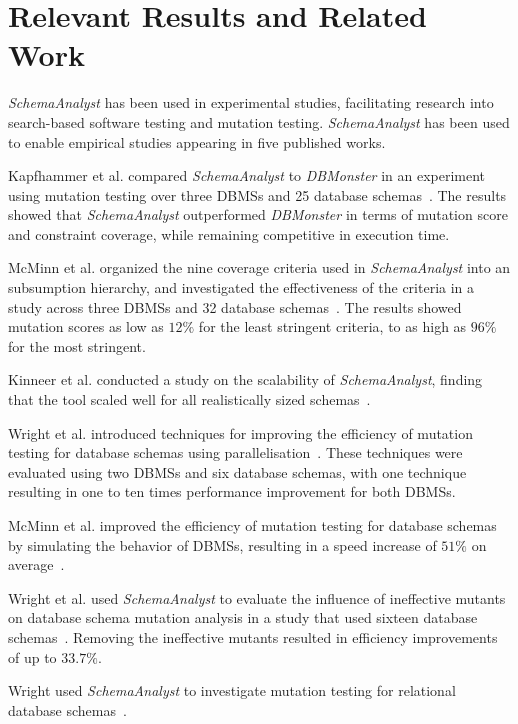 \section{Relevant Results and Related Work}\label{sec:relatedwork}

\textit{SchemaAnalyst} has been used in experimental studies, facilitating research into search-based software testing
and mutation testing.  \textit{SchemaAnalyst} has been used to enable empirical studies appearing in five published
works.

Kapfhammer et al. compared \textit{SchemaAnalyst} to \textit{DBMonster} in an experiment using mutation testing over
three DBMSs and 25 database schemas~\cite{kapfhammer2013search}. The results showed that \textit{SchemaAnalyst}
outperformed \textit{DBMonster} in terms of mutation score and constraint coverage, while remaining competitive in
execution time.

McMinn et al. organized the nine coverage criteria used in \textit{SchemaAnalyst} into an subsumption hierarchy, and
investigated the effectiveness of the criteria in a study across three DBMSs and 32 database
schemas~\cite{mcminn2015effectiveness}.  The results showed mutation scores as low as $12\%$ for the least stringent
criteria, to as high as $96\%$ for the most stringent.

Kinneer et al. conducted a study on the scalability of \textit{SchemaAnalyst}, finding that the tool scaled well for all
realistically sized schemas~\cite{kinneer2015automatically, Kinneer2015a}.

Wright et al. introduced techniques for improving the efficiency of mutation testing for database schemas using
parallelisation~\cite{wright2013efficient}. These techniques were evaluated using two DBMSs and six database schemas,
with one technique resulting in one to ten times performance improvement for both DBMSs.

McMinn et al. improved the efficiency of mutation testing for database schemas by simulating the behavior of DBMSs,
resulting in a speed increase of $51\%$ on average~\cite{mcminn2016virtual}.

Wright et al. used \textit{SchemaAnalyst} to evaluate the influence of ineffective mutants on database schema mutation
analysis in a study that used sixteen database schemas~\cite{wright2014impact}. Removing the ineffective mutants
resulted in efficiency improvements of up to $33.7\%$.

Wright used \textit{SchemaAnalyst} to investigate mutation testing for relational database
schemas~\cite{wright2015mutation}.

